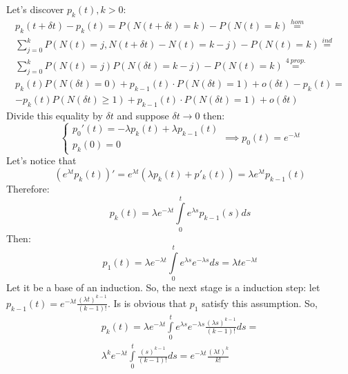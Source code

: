 \documentclass[a4paper, 12pt]{article}
\newcommand{\rbra}[1]{\left( #1 \right)}
\begin{document}
\begin{enumerate}
\begin{enumerate}
{                  Let's discover $p_k(t), k > 0$:
                  \begin{multline*}
                      p_k(t + \delta t) - p_k(t) = P(N(t + \delta t) = k) - P(N(t) = k) \stackrel{hom}{=} \\
                      \sum\limits_{j=0}^{k} P(N(t) = j, N(t + \delta t) - N(t) = k - j) - P(N(t) = k) \stackrel{ind}{=} \\
                      \sum\limits_{j=0}^{k} P(N(t) = j) P(N(\delta t) = k - j) - P(N(t) = k) \stackrel{4\ prop.}{=} \\
                      p_k(t) P(N(\delta t) = 0) + p_{k-1}(t) \cdot P(N(\delta t) = 1) + o(\delta t) - p_k(t) = \\
                      -p_k(t) P(N(\delta t) \geq 1  ) + p_{k-1}(t) \cdot P(N(\delta t) = 1) + o(\delta t)
                  \end{multline*}
                  Divide this equality by $\delta t$ and suppose $\delta t \rightarrow 0$ then:
                  \[
                      \begin{cases}
                          p_0'(t) = - \lambda p_k(t) + \lambda p_{k-1}(t) \\
                          p_k(0) = 0
                      \end{cases} \implies
                      p_0(t) = e^{-\lambda t}
                  \]
                  Let's notice that
                  \[
                      \rbra{e^{\lambda t} p_k(t)}' = e^{\lambda t} \rbra{\lambda p_k(t) + p'_k(t)} =
                      \lambda e^{\lambda t} p_{k-1}(t)
                  \]
                  Therefore:
                  \[
                      p_k(t) = \lambda e^{-\lambda t} \int\limits_0^t e^{\lambda s} p_{k-1}(s) ds
                  \]
                  Then:
                  \[
                      p_1(t) = \lambda e^{-\lambda t} \int\limits_0^t e^{\lambda s} e^{-\lambda s} ds = \lambda t e^{-\lambda t}
                  \]
                  Let it be a base of an induction. So, the next stage is a induction step: let
                  $p_{k-1}(t) = e^{-\lambda t} \frac{(\lambda t)^{k-1}}{(k-1)!}$. Is is obvious that $p_1$ satisfy this
                  assumption. So,
                  \begin{multline*}
                      p_k(t) = \lambda e^{-\lambda t} \int\limits_0^t e^{\lambda s} e^{-\lambda s} \frac{(\lambda s)^{k-1}}{(k-1)!} ds = \\
                      \lambda^k e^{-\lambda t} \int\limits_0^t \frac{(s)^{k-1}}{(k-1)!} ds =
                      e^{-\lambda t} \frac{(\lambda t) ^ k}{k!}
                  \end{multline*}

}
\end{enumerate}
\end{enumerate}
\end{document}
